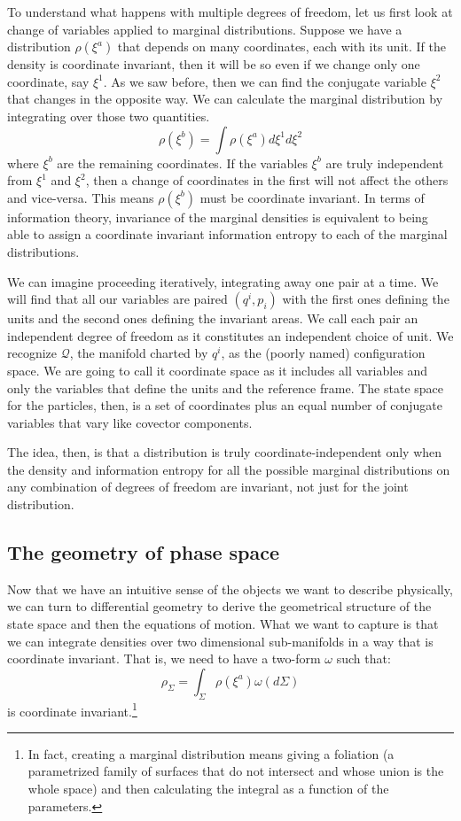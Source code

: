 \documentclass[11pt]{elsarticle}
\begin{document}
To understand what happens with multiple degrees of freedom, let us first look at change of variables applied to marginal distributions. Suppose we have a distribution $\rho(\xi^a)$ that depends on many coordinates, each with its unit. If the density is coordinate invariant, then it will be so even if we change only one coordinate, say $\xi^1$. As we saw before, then we can find the conjugate variable $\xi^2$ that changes in the opposite way. We can calculate the marginal distribution by integrating over those two quantities.
\begin{equation}
\rho(\xi^b) = \int \rho(\xi^a) d\xi^1 d\xi^2
\end{equation}
where $\xi^b$ are the remaining coordinates. If the variables $\xi^b$ are truly independent from $\xi^1$ and $\xi^2$, then a change of coordinates in the first will not affect the others and vice-versa. This means $\rho(\xi^b)$ must be coordinate invariant. In terms of information theory, invariance of the marginal densities is equivalent to being able to assign a coordinate invariant information entropy to each of the marginal distributions.

We can imagine proceeding iteratively, integrating away one pair at a time. We will find that all our variables are paired $(q^i, p_i)$  with the first ones defining the units and the second ones defining the invariant areas. We call each pair an independent degree of freedom as it constitutes an independent choice of unit. We recognize $\mathcal{Q}$, the manifold charted by $q^i$, as the (poorly named) configuration space. We are going to call it coordinate space as it includes all variables and only the variables that define the units and the reference frame. The state space for the particles, then, is a set of coordinates plus an equal number of conjugate variables that vary like covector components.

The idea, then, is that a distribution is truly coordinate-independent only when the density and information entropy for all the possible marginal distributions on any combination of degrees of freedom are invariant, not just for the joint distribution.

\subsection*{The geometry of phase space}

Now that we have an intuitive sense of the objects we want to describe physically, we can turn to differential geometry to derive the geometrical structure of the state space and then the equations of motion. What we want to capture is that we can integrate densities over two dimensional sub-manifolds in a way that is coordinate invariant. That is, we need to have a two-form $\omega$ such that:
\begin{equation}
\rho_\Sigma = \int_\Sigma \rho(\xi^a) \omega(d\Sigma)
\end{equation}
is coordinate invariant.\footnote{In fact, creating a marginal distribution means giving a foliation (a parametrized family of surfaces that do not intersect and whose union is the whole space) and then calculating the integral as a function of the parameters.}
\end{document}
